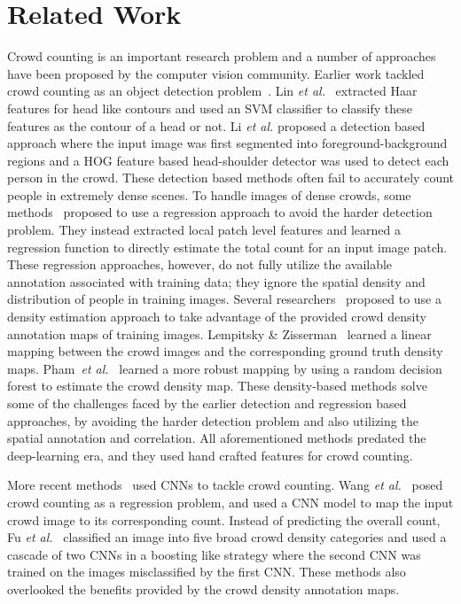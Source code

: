 \documentclass[runningheads]{llncs}
\begin{document}
\section{Related Work} \label{sec:RelatedWork}
Crowd counting is an important research problem and a number of approaches have been proposed by the computer vision community. Earlier work tackled crowd counting as an object detection problem~\cite{li2008estimating,lin2001estimation}. Lin \textit{et al.}~\cite{lin2001estimation} extracted Haar features for head like contours and used an SVM classifier to classify these features as the contour of a head or not. Li \textit{et al.} \cite{li2008estimating} proposed a detection based approach where the input image was first segmented into foreground-background regions and a HOG feature based head-shoulder detector was used to detect each person in the crowd. These detection based methods often fail to accurately count people in extremely dense scenes. To handle images of dense crowds, some methods~\cite{chan2009bayesian,chen2012feature} proposed to use a regression approach to avoid the harder detection problem. They instead extracted local patch level features and learned a regression function to directly estimate the total count for an input image patch. These regression approaches, however, do not fully utilize the available annotation associated with training data; they ignore the spatial density and distribution of people in training images. Several researchers~\cite{lempitsky2010learning,pham2015count} proposed to use a density estimation approach to take advantage of the provided crowd density annotation maps of training images. Lempitsky \& Zisserman~\cite{lempitsky2010learning} learned a linear mapping between the crowd images and the corresponding ground truth density maps. Pham~\textit{et al.}~\cite{pham2015count} learned a more robust mapping by using a random decision forest to estimate the crowd density map. These density-based methods solve some of the challenges faced by the earlier detection and regression based approaches, by avoiding the harder detection problem and also utilizing the spatial annotation and correlation. All aforementioned methods predated the deep-learning era, and they used hand crafted features for crowd counting. 




More recent methods~\cite{wang2015deep,fu2015fast,zhang2016single,sam2017switching,onoro2016towards,sindagi2017generating} used CNNs to tackle crowd counting. Wang \textit{et al.}~\cite{wang2015deep} posed crowd counting as a regression problem, and used a CNN model to map the input crowd image to its corresponding count. Instead of predicting the overall count, Fu \textit{et al.}~\cite{fu2015fast} classified an image into five broad crowd density categories and used a cascade of two CNNs in a boosting like strategy where the second CNN was trained on the images misclassified by the first CNN. These methods also overlooked the benefits provided by the crowd density annotation maps. 
\end{document}
